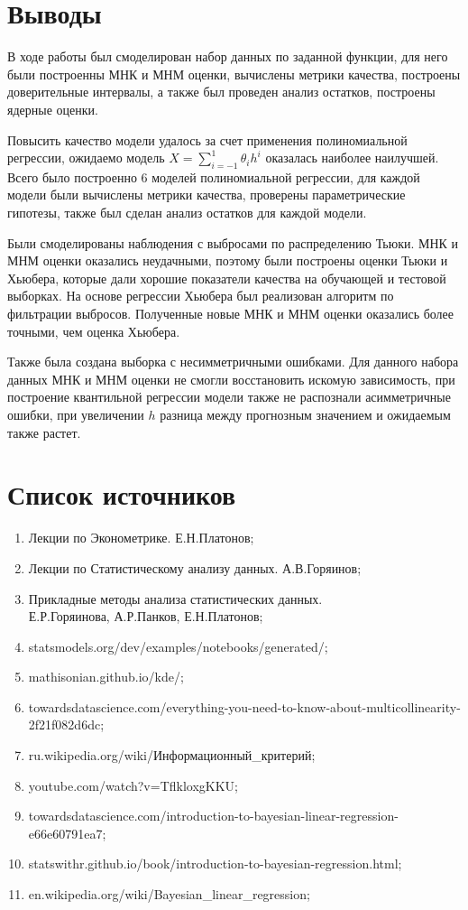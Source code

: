 \documentclass[a4paper,12pt]{article}
\begin{document}
\section{Выводы}

В ходе работы был смоделирован набор данных по заданной функции, для него были построенны МНК и МНМ оценки, вычислены метрики качества, построены доверительные интервалы, а также был проведен анализ остатков, построены ядерные оценки.

Повысить качество модели удалось за счет применения полиномиальной регрессии, ожидаемо модель $X=\sum\limits_{i=-1}^1 \theta_i h^i$ оказалась наиболее наилучшей. Всего было построенно 6 моделей полиномиальной регрессии, для каждой модели были вычислены метрики качества, проверены параметрические гипотезы, также был сделан анализ остатков для каждой модели.

Были смоделированы наблюдения с выбросами по распределению Тьюки. МНК и МНМ оценки оказались неудачными, поэтому были построены оценки Тьюки и Хьюбера, которые дали хорошие показатели качества на обучающей и тестовой выборках. На основе регрессии Хьюбера был реализован алгоритм по фильтрации выбросов. Полученные новые МНК и МНМ оценки оказались более точными, чем оценка Хьюбера.

Также была создана выборка с несимметричными ошибками. Для данного набора данных МНК и МНМ оценки не смогли восстановить искомую зависимость, при построение квантильной регрессии модели также не распознали асимметричные ошибки, при увеличении $h$ разница между прогнозным значением и ожидаемым также растет.



\section{Список источников}

\begin{enumerate}
    \item Лекции по Эконометрике. Е.Н.Платонов;
    \item Лекции по Статистическому анализу данных. А.В.Горяинов;
    \item Прикладные методы анализа статистических данных.\\
    Е.Р.Горяинова, А.Р.Панков, Е.Н.Платонов;
    \item statsmodels.org/dev/examples/notebooks/generated/;
    \item mathisonian.github.io/kde/;
    \item towardsdatascience.com/everything-you-need-to-know-about-multicollinearity-2f21f082d6dc;
    \item ru.wikipedia.org/wiki/Информационный\_критерий;
    \item youtube.com/watch?v=TflkloxgKKU;
    \item towardsdatascience.com/introduction-to-bayesian-linear-regression-e66e60791ea7;
    \item statswithr.github.io/book/introduction-to-bayesian-regression.html;
    \item en.wikipedia.org/wiki/Bayesian\_linear\_regression;
\end{enumerate}
\end{document}
